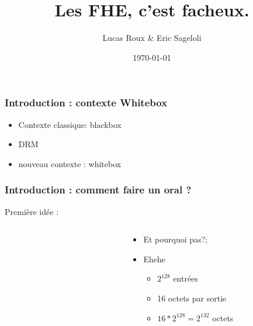 \documentclass[15pt]{beamer}
\title{Les FHE, c'est facheux.}
\date{\today}
\author{Lucas Roux \& Eric Sageloli}
\begin{document}

\begin{frame}
  \maketitle
\end{frame}


\begin{frame}
  \frametitle{Introduction : contexte Whitebox}
\begin{itemize}
  \item Contexte classique:  blackbox
  \item DRM 
  \item nouveau contexte : whitebox
  \end{itemize}
\end{frame}


\begin{frame}
  
  \frametitle{Introduction : comment faire un oral ?}
  
  
  Première idée : 
  
  \begin{columns}[T] %
    
    \begin{column}{.48\textwidth}
      \begin{figure}
        \begin{center}
          \begin{tikzpicture}[scale = 1, transform shape]
	    
          \end{tikzpicture}
        \end{center}
      \end{figure}
    \end{column}

    \begin{column}{.48\textwidth}
      \vspace{2cm}
      \begin{itemize}
      \item<2-> Et pourquoi pas?;
      \item<3-> Ehehe
        \begin{itemize}
        \item $2^{128}$ entrées
        \item 16 octets par sortie
        \item $16 * 2^{128} = 2^{132}$ octets 
        \end{itemize}
      \end{itemize}
    \end{column}
    
  \end{columns}

\end{frame}
\end{document}
